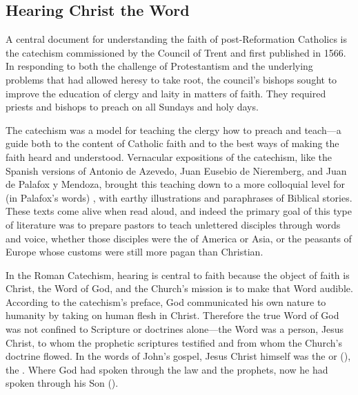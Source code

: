 \subsection{Hearing Christ the Word}

A central document for understanding the faith of post-Reformation Catholics is the catechism  commissioned by the Council of Trent and first published in 1566.%
    \Autocites{Catholic:Catechismus1614}[]{NewCatholic}
In responding to both the challenge of Protestantism and the underlying problems that had allowed heresy to take root, the council's bishops sought to improve the education of clergy and laity in matters of faith.
They required priests and bishops to preach on all Sundays and holy days.%
    \Autocite[]{NewCatholic}

The catechism was a model for teaching the clergy how to preach and teach---a guide both to the content of Catholic faith and to the best ways of making the faith heard and understood.
Vernacular expositions of the catechism, like the Spanish versions of Antonio de Azevedo, Juan Eusebio de Nieremberg, and Juan de Palafox y Mendoza, brought this teaching down to a more colloquial level for (in Palafox's words) , with earthy illustrations and paraphrases of Biblical stories.%
    \Autocites{Azevedo:Catecismo}{Nieremberg:PracticaCatecismo}{Palafox:Bocados}
These texts come alive when read aloud, and indeed the primary goal of this type of literature was to prepare pastors to teach unlettered disciples through words and voice, whether those disciples were the  of America or Asia, or the peasants of Europe whose customs were still more pagan than Christian.%
    \Autocites
    [On Europe as a mission front after Trent, see]
    [60--63]{Kamen:EarlyModernSociety}

In the Roman Catechism, hearing is central to faith because the object of faith is Christ, the Word of God, and the Church's mission is to make that Word audible.
According to the catechism's preface, God communicated his own nature to humanity by taking on human flesh in Christ.
Therefore the true Word of God was not confined to Scripture or doctrines alone---the Word was a person, Jesus Christ, to whom the prophetic scriptures testified and from whom the Church's doctrine flowed.%
    \Autocite
    [9: .]
    {Catholic:Catechismus1614}
In the words of John's gospel, Jesus Christ himself was the  or  (), the .
Where God had spoken through the law and the prophets, now he had spoken through his Son ().

